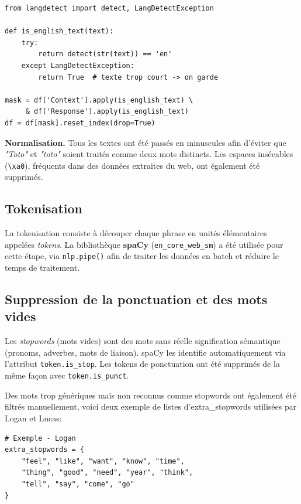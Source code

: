 \documentclass[12pt,a4paper]{report}
\begin{document}
\begin{lstlisting}
from langdetect import detect, LangDetectException

def is_english_text(text):
    try:
        return detect(str(text)) == 'en'
    except LangDetectException:
        return True  # texte trop court -> on garde

mask = df['Context'].apply(is_english_text) \
     & df['Response'].apply(is_english_text)
df = df[mask].reset_index(drop=True)
\end{lstlisting}

\textbf{Normalisation.}
Tous les textes ont été passés en minuscules afin d'éviter que \textit{"Toto"} et \textit{"toto"}
soient traités comme deux mots distincts. Les espaces insécables (\texttt{\textbackslash xa0}),
fréquents dans des données extraites du web, ont également été supprimés.

\subsection{Tokenisation}

La tokenisation consiste à découper chaque phrase en unités élémentaires appelées
\textit{tokens}. La bibliothèque \textbf{spaCy} (\texttt{en\_core\_web\_sm}) a été utilisée
pour cette étape, via \texttt{nlp.pipe()} afin de traiter les données en batch et réduire le
temps de traitement.

\subsection{Suppression de la ponctuation et des mots vides}
\label{stopwords}

Les \textit{stopwords} (mots vides) sont des mots sans réelle signification sémantique
(pronoms, adverbes, mots de liaison). spaCy les identifie automatiquement via l'attribut
\texttt{token.is\_stop}. Les tokens de ponctuation ont été supprimés de la même façon avec
\texttt{token.is\_punct}.

Des mots trop génériques mais non reconnus comme stopwords ont également été filtrés
manuellement, voici deux exemple de listes d'extra\_stopwords utilisées par Logan et Lucas:

\begin{lstlisting}
# Exemple - Logan
extra_stopwords = {
    "feel", "like", "want", "know", "time",
    "thing", "good", "need", "year", "think",
    "tell", "say", "come", "go"
}
\end{lstlisting}
\end{document}
